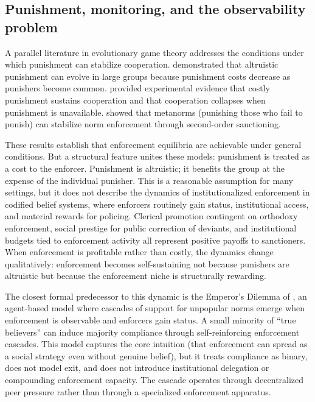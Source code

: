 \documentclass[12pt]{article}
\begin{document}
\subsection{Punishment, monitoring, and the observability problem}

A parallel literature in evolutionary game theory addresses the conditions under which punishment can stabilize cooperation. \citet{boyd2003} demonstrated that altruistic punishment can evolve in large groups because punishment costs decrease as punishers become common. \citet{fehrgachter2000,fehr2002} provided experimental evidence that costly punishment sustains cooperation and that cooperation collapses when punishment is unavailable. \citet{axelrod1986} showed that metanorms (punishing those who fail to punish) can stabilize norm enforcement through second-order sanctioning.

These results establish that enforcement equilibria are achievable under general conditions. But a structural feature unites these models: punishment is treated as a cost to the enforcer. Punishment is altruistic; it benefits the group at the expense of the individual punisher. This is a reasonable assumption for many settings, but it does not describe the dynamics of institutionalized enforcement in codified belief systems, where enforcers routinely gain status, institutional access, and material rewards for policing. Clerical promotion contingent on orthodoxy enforcement, social prestige for public correction of deviants, and institutional budgets tied to enforcement activity all represent positive payoffs to sanctioners. When enforcement is profitable rather than costly, the dynamics change qualitatively: enforcement becomes self-sustaining not because punishers are altruistic but because the enforcement niche is structurally rewarding.

The closest formal predecessor to this dynamic is the Emperor's Dilemma of \citet{centola2005}, an agent-based model where cascades of support for unpopular norms emerge when enforcement is observable and enforcers gain status. A small minority of ``true believers'' can induce majority compliance through self-reinforcing enforcement cascades. This model captures the core intuition (that enforcement can spread as a social strategy even without genuine belief), but it treats compliance as binary, does not model exit, and does not introduce institutional delegation or compounding enforcement capacity. The cascade operates through decentralized peer pressure rather than through a specialized enforcement apparatus.
\end{document}
